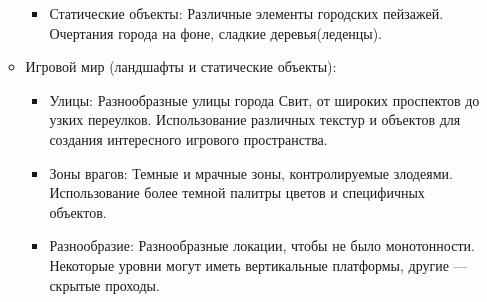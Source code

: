 \documentclass[article,12pt, fleqn]{article}
\begin{document}
\begin{itemize}
\begin{itemize}
\begin{itemize}
        \item Статические объекты: Различные элементы городских пейзажей. Очертания города на фоне, сладкие деревья(леденцы).
         \begin{figure}[ht]
            \centering
            \begin{minipage}[b]{0.3\textwidth}
            \end{minipage}\hfill
            \begin{minipage}[b]{0.3\textwidth}
            \end{minipage}
            \caption{}
        \end{figure}
    \end{itemize}
    \item Игровой мир (ландшафты и статические объекты):
    \begin{itemize}
        \item Улицы: Разнообразные улицы города Свит, от широких проспектов до узких переулков. Использование различных текстур и объектов для создания интересного игрового пространства.
        \item Зоны врагов: Темные и мрачные зоны, контролируемые злодеями. Использование более темной палитры цветов и специфичных объектов.
        \begin{figure}[ht]
            \centering
            \begin{minipage}[b]{0.3\textwidth}
            \end{minipage}\hfill
            \begin{minipage}[b]{0.3\textwidth}
            \end{minipage}
            \caption{}
        \end{figure}
        \item Разнообразие: Разнообразные локации, чтобы не было монотонности. Некоторые уровни могут иметь вертикальные платформы, другие — скрытые проходы.
        \begin{figure}[ht]
            \centering
            \begin{minipage}[b]{0.3\textwidth}
            \end{minipage}\hfill

\end{figure}
\end{itemize}
\end{itemize}
\end{itemize}
\end{document}
